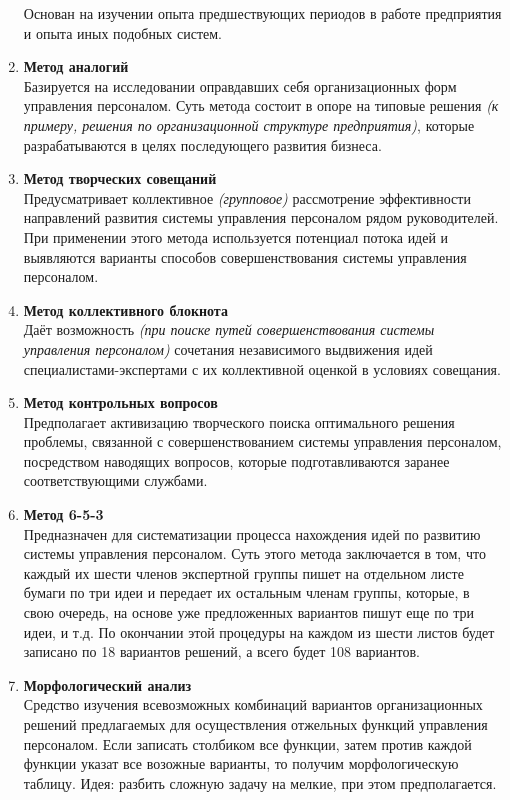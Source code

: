 \documentclass[a4paper,12pt,oneside,final]{extarticle}
\numberwithin{equation}{section}
\begin{document}
\begin{enumerate}
	Основан на изучении опыта предшествующих периодов в работе предприятия и опыта иных подобных систем.
	\item \textbf{Метод аналогий} \\
	Базируется на исследовании оправдавших себя организационных форм управления персоналом. 
	Суть метода состоит в опоре на типовые решения \textit{(к примеру, решения по организационной структуре предприятия)}, которые разрабатываются в целях последующего развития бизнеса.
	\item \textbf{Метод творческих совещаний} \\ 
	Предусматривает коллективное \textit{(групповое)} рассмотрение эффективности направлений развития системы управления персоналом рядом руководителей. 
	При применении этого метода используется потенциал потока идей и выявляются варианты способов совершенствования системы управления персоналом.
	\item \textbf{Метод коллективного блокнота} \\ 
	Даёт возможность \textit{(при поиске путей совершенствования системы управления персоналом)} сочетания независимого выдвижения идей специалистами-экспертами с их коллективной оценкой в условиях совещания.
	\item \textbf{Метод контрольных вопросов} \\ 
	Предполагает активизацию творческого поиска оптимального решения проблемы, связанной с совершенствованием системы управления персоналом, посредством наводящих вопросов, которые подготавливаются заранее соответствующими службами.
	\item \textbf{Метод 6-5-3} \\
	Предназначен для систематизации процесса нахождения идей по развитию системы управления персоналом. 
	Суть этого метода заключается в том, что каждый их шести членов экспертной группы пишет на отдельном листе бумаги по три идеи и передает их остальным членам группы, которые, в свою очередь, на основе уже предложенных вариантов пишут еще по три идеи, и т.д. 
	По окончании этой процедуры на каждом из шести листов будет записано по 18 вариантов решений, а всего будет 108 вариантов.
	\item \textbf{Морфологический анализ} \\ 
	Средство изучения всевозможных комбинаций вариантов организационных решений предлагаемых для осуществления отжельных функций управления персоналом. 
	Если записать столбиком все функции, затем против каждой функции указат все возожные варианты, то получим морфологическую таблицу. 
	Идея: разбить сложную задачу на мелкие, при этом предполагается.
\end{enumerate}
\end{document}
